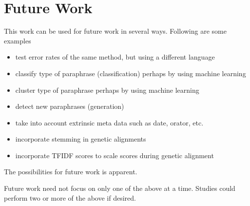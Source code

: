 \section {Future Work}
This work can be used for future work in several ways. Following are some examples 
	\begin {itemize}
		\item test error rates of the same method, but using a different language
		\item classify type of paraphrase (classification) perhaps by using machine learning
		\item cluster type of paraphrase perhaps by using machine learning
		\item detect new paraphrases (generation)
		\item take into account extrinsic meta data such as date, orator, etc.
		\item incorporate stemming in genetic alignments
		\item incorporate TFIDF scores to scale scores during genetic alignment
	\end {itemize}
The possibilities for future work is apparent. 

Future work need not focus on only one of the above at a time.  Studies could perform two or more of the above if desired. 